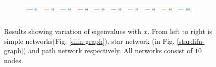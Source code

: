 \documentclass[10pt,a4paper]{article}
\begin{document}
\begin{figure}[!h]
\begin{subfigure}[b]{0.32\textwidth}
	\end{subfigure} \\
    \begin{subfigure}[b]{0.85\textwidth}
    	\includegraphics[width= \textwidth]{images/legend-eigenvalues.png}
    \end{subfigure}
	\caption{Results showing variation of eigenvalues with $x$. From left to right is simple networks(Fig. \ref{difn-graph}), star network (in Fig. \ref{stardifn-graph}) and path network respectively. All networks consist of $10$ nodes.}
	\label{}
\end{figure}

%
%
\end{document}
